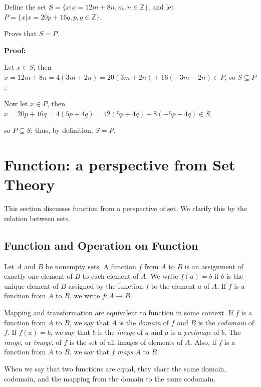 \begin{exercise}
    Define the set $S = \{x | x = 12m + 8n, m,n \in \mathbb{Z}\}$, and let $P = \{x | x = 20p + 16q, p,q \in \mathbb{Z}\}$.

Prove that $S = P$.
\end{exercise}
\textbf{Proof:}

Let $x \in S$, then $x = 12m + 8n = 4(3m + 2n) = 20(3m + 2n) + 16(-3m - 2n) \in P$, so $S \subseteq P$;

Now let $x \in P$, then $x = 20p + 16q = 4(5p + 4q) = 12(5p + 4q) + 8(-5p - 4q) \in S$,

so $P \subseteq S$; thus, by definition, $S = P$.
\section{Function: a perspective from Set Theory}
This section discusses function from a perspective of set. We clarify this by the relation between sets.
\subsection{Function and Operation on Function}
\begin{definition}[Function]

Let \( A \) and \( B \) be nonempty sets. A function \( f \) from \( A \) to \( B \) is an assignment of exactly one element of \( B \) to each element of \( A \). We write \( f(a) = b \) if \( b \) is the unique element of \( B \) assigned by the function \( f \) to the element \( a \) of \( A \). If \( f \) is a function from \( A \) to \( B \), we write \( f : A \rightarrow B \).
    
\end{definition}
\begin{remark}
    Mapping and transformation are equivalent to function in some context. If \( f \) is a function from \( A \) to \( B \), we say that \( A \) is the \emph{domain} of \( f \) and \( B \) is the \emph{codomain} of \( f \). If \( f(a) = b \), we say that \( b \) is the \emph{image} of \( a \) and \( a \) is a \emph{preimage} of \( b \). The \emph{range}, or \emph{image}, of \( f \) is the set of all images of elements of \( A \). Also, if \( f \) is a function from \( A \) to \( B \), we say that \( f \) \emph{maps} \( A \) to \( B \).
\end{remark}

When we say that two functions are equal, they share the same domain, codomain, and the mapping from the domain to the same codomain.

